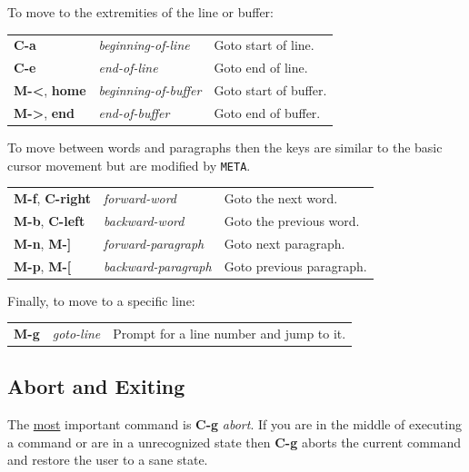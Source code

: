 \documentclass[11pt,a4paper,pdftex]{article}
\begin{document}
  To move to the extremities of the line or buffer:

  \begin{longtable}{ll@{\ --\ }l}
    \endhead
    \endfoot
    \endlastfoot
    \textbf{C-a} & \textit{beginning-of-line} &
    Goto start of line.\\
    \textbf{C-e} & \textit{end-of-line} &
    Goto end of line.\\
    \textbf{M-<}, \textbf{home} & \textit{beginning-of-buffer} &
    Goto start of buffer.\\
    \textbf{M->}, \textbf{end} & \textit{end-of-buffer} &
    Goto end of buffer.\\
  \end{longtable}

  To move between words and paragraphs then the keys are similar to the basic
  cursor movement but are modified by \texttt{META}.

  \begin{longtable}{ll@{\ --\ }l}
    \endhead
    \endfoot
    \endlastfoot
    \textbf{M-f}, \textbf{C-right} & \textit{forward-word} &
    Goto the next word.\\
    \textbf{M-b}, \textbf{C-left} & \textit{backward-word} &
    Goto the previous word.\\
    \textbf{M-n}, \textbf{M-]} & \textit{forward-paragraph} &
    Goto next paragraph.\\
    \textbf{M-p}, \textbf{M-[} & \textit{backward-paragraph} &
    Goto previous paragraph.\\
  \end{longtable}

  Finally, to move to a specific line:

  \begin{longtable}{ll@{\ --\ }l}
    \endhead
    \endfoot
    \endlastfoot
    \textbf{M-g} & \textit{goto-line} &
    Prompt for a line number and jump to it.\\
  \end{longtable}

\subsection{Abort and Exiting}

  The \underline{most} important command is \textbf{C-g} \textit{abort}. If
  you are in the middle of executing a command or are in a unrecognized state
  then \textbf{C-g} aborts the current command and restore the user to a sane
  state.
\end{document}
